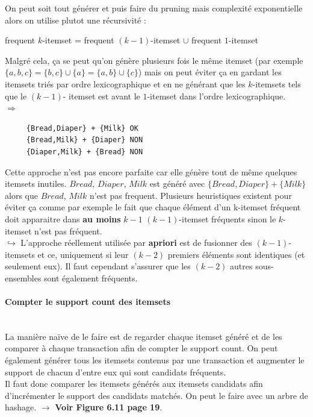 \documentclass{article}
\begin{document}
\begin{sffamily}
On peut soit tout générer et puis faire du pruning mais complexité exponentielle alors on utilise plutot une récursivité :
	  \begin{center}
	  frequent $k$-itemset = frequent $(k-1)$-itemset $\cup$ frequent $1$-itemset
	  \end{center}
Malgré cela, ça se peut qu'on génère plusieurs fois le même itemset (par exemple $\{a,b,c\} = \{b,c\} \cup \{a\} = \{a,b\} \cup \{c\}$) 
mais on peut éviter ça en gardant les itemsets triés par ordre lexicographique et en ne générant que les $k$-itemsets tels que le $(k-1)$-
itemset est avant le $1$-itemset dans l'ordre lexicographique. \\
$\Rightarrow$ 
\begin{verbatim}
     {Bread,Diaper} + {Milk} OK
     {Bread,Milk} + {Diaper} NON
     {Diaper,Milk} + {Bread} NON
\end{verbatim}

Cette approche n'est pas encore parfaite car elle génère tout de même quelques itemsets inutiles. $Bread$, $Diaper$, $Milk$ est généré avec 
$\{Bread,Diaper\} + \{Milk\}$ alors que $Bread$, $Milk$ n'est pas frequent. Plusieurs heuristiques existent pour éviter ça comme par 
exemple le fait que chaque élément d'un k-itemset fréquent doit apparaitre dans \textbf{au moins} $k-1$ $(k-1)$-itemset fréquents sinon le 
$k$-itemset n'est pas fréquent. \\

$\hookrightarrow$ L'approche réellement utilisée par \textbf{apriori} est de fusionner des $(k-1)$-itemsets et ce, uniquement si leur 
$(k-2)$ premiers éléments sont identiques (et seulement eux). Il faut cependant s'assurer que les $(k-2)$ autres sous-ensembles sont
également fréquents.

\paragraph{Compter le support count des itemsets}$ $\\
La manière naïve de le faire est de regarder chaque itemset généré et de les comparer à chaque transaction afin de compter le support 
count. On peut également générer tous les itemsets contenus par une transaction et augmenter le support de chacun d'entre eux qui sont 
candidats fréquents. \\
Il faut donc comparer les itemsets générés aux itemsets candidats afin d'incrémenter le support des candidats matchés. On peut le faire 
avec un arbre de hashage. $\rightarrow$ \textbf{Voir Figure 6.11 page 19}.


\end{sffamily}
\end{document}
